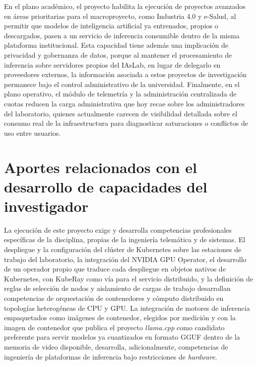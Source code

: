 En el plano académico, el proyecto habilita la ejecución de proyectos avanzados en áreas prioritarias para el macroproyecto, como Industria 4.0 y e-Salud, al permitir que modelos de inteligencia artificial ya entrenados, propios o descargados, pasen a un servicio de inferencia consumible dentro de la misma plataforma institucional. Esta capacidad tiene además una implicación de privacidad y gobernanza de datos, porque al mantener el procesamiento de inferencia sobre servidores propios del IAsLab, en lugar de delegarlo en proveedores externos, la información asociada a estos proyectos de investigación permanece bajo el control administrativo de la universidad. Finalmente, en el plano operativo, el módulo de telemetría y la administración centralizada de cuotas reducen la carga administrativa que hoy recae sobre los administradores del laboratorio, quienes actualmente carecen de visibilidad detallada sobre el consumo real de la infraestructura para diagnosticar saturaciones o conflictos de uso entre usuarios.

\section{Aportes relacionados con el desarrollo de capacidades del investigador}

La ejecución de este proyecto exige y desarrolla competencias profesionales específicas de la disciplina, propias de la ingeniería telemática y de sistemas. El despliegue y la configuración del clúster de Kubernetes sobre las estaciones de trabajo del laboratorio, la integración del NVIDIA GPU Operator, el desarrollo de un operador propio que traduce cada despliegue en objetos nativos de Kubernetes, con KubeRay como vía para el servicio distribuido, y la definición de reglas de selección de nodos y aislamiento de cargas de trabajo desarrollan competencias de orquestación de contenedores y cómputo distribuido en topologías heterogéneas de CPU y GPU. La integración de motores de inferencia empaquetados como imágenes de contenedor, elegidos por medición y con la imagen de contenedor que publica el proyecto \emph{llama.cpp} como candidato preferente para servir modelos ya cuantizados en formato GGUF dentro de la memoria de video disponible, desarrolla, adicionalmente, competencias de ingeniería de plataformas de inferencia bajo restricciones de \emph{hardware}.

